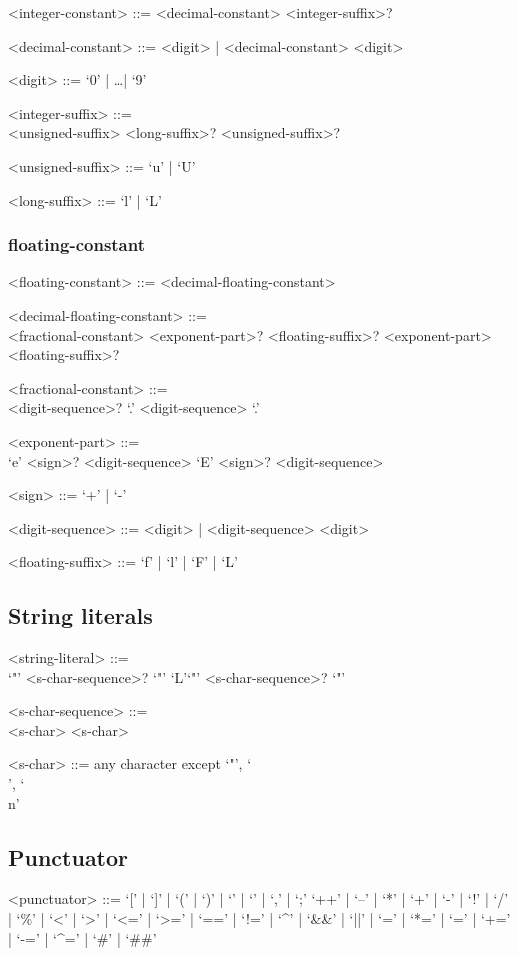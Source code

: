 \documentclass[a4paper]{article}
\begin{document}
\begin{grammar}
	<integer-constant> ::= <decimal-constant> <integer-suffix>?

	<decimal-constant> ::= <digit> | <decimal-constant> <digit>

	<digit> ::= `0' | \dots | `9'

	<integer-suffix> ::= \hfill \\
		<unsigned-suffix> <long-suffix>?
		\alt <long-suffix> <unsigned-suffix>?
	
	<unsigned-suffix> ::= `u' | `U'

	<long-suffix> ::= `l' | `L'
	
\end{grammar}

\subsubsection{floating-constant}

\begin{grammar}
	<floating-constant> ::= <decimal-floating-constant>

	<decimal-floating-constant> ::= \hfill \\
		<fractional-constant> <exponent-part>? <floating-suffix>?
		\alt <digit-sequence> <exponent-part> <floating-suffix>?

	<fractional-constant> ::= \hfill \\ 
		<digit-sequence>? `.' <digit-sequence> 
		\alt <digit-sequence> `.'

	<exponent-part> ::= \hfill \\
		`e' <sign>? <digit-sequence>
		\alt `E' <sign>? <digit-sequence>
	
	<sign> ::= `+' | `-'

	<digit-sequence> ::= <digit> | <digit-sequence> <digit>

	<floating-suffix> ::= `f' | `l' | `F' | `L'
\end{grammar}

\subsection{String literals}

\begin{grammar}
	<string-literal> ::= \hfill \\
		`"' <s-char-sequence>? `"'
			\alt `L'`"' <s-char-sequence>? `"'
	
	<s-char-sequence> ::= \hfill \\ 
		<s-char>
		\alt <s-char-sequence> <s-char>
	
	<s-char> ::= any character except `"', `\\', `\\n'
		\alt <escape-sequence>
\end{grammar}

\subsection{Punctuator}

\begin{grammar}
	<punctuator> ::= `[' | `]' | `(' | `)' | `{' | `}' | `,' | `;'
		`++' | `--' | `*' | `+' | `-' | `!' | `/' | `\%' | `<' | `>' |
		`<=' | `>=' | `==' | `!=' | `^' | `&&' | `||' |
		`=' | `*=' | `\/=' | `+=' | `-=' | `^=' |
		`#' | `##'
	
\end{grammar}
	
\end{document}

